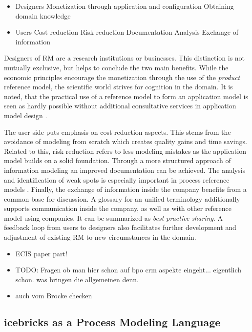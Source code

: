 		\begin{itemize}
			\item Designers
			\subitem Monetization through application and configuration
			\subitem Obtaining domain knowledge
			\item Users
			\subitem Cost reduction
			\subitem Risk reduction
			\subitem Documentation
			\subitem Analysis
			\subitem Exchange of information  
		\end{itemize} 
	
		Designers of \acrshort{RM} are a research institutions or businesses. This distinction is not mutually exclusive,  but helps to conclude the two main benefits. While the economic principles encourage the monetization through the use of the \textit{product} reference model, the scientific world strives for cognition in the domain. It is noted, that the practical use of a reference model to form an application model is seen as hardly possible without additional consultative services in application model design \citep{Schutte1998}.
	
		The user side puts emphasis on cost reduction aspects. This stems from the avoidance of modeling from scratch which creates quality gains and time savings. Related to this, risk reduction refers to less modeling mistakes as the application model builds on a solid foundation. Through a more structured approach of information modeling an improved documentation can be achieved. The analysis and identification of weak spots is especially important in process reference models \citep[]{becker2004handelsinformationssysteme}. Finally, the exchange of information inside the company benefits from a common base for discussion. A glossary for an unified terminology additionally supports communication inside the company, as well as with other reference model using companies. It can be summarized as \textit{best practice sharing}. A feedback loop from users to designers also facilitates further development and adjustment of existing \acrshort{RM} to new circumstances in the domain. 
		
		\begin{itemize}
			\item  ECIS paper part!
			\item TODO: Fragen ob man hier schon auf bpo crm aspekte eingeht... eigentlich schon. was bringen die allgemeinen denn. 
			\item auch vom Brocke checken 
		\end{itemize}
		\subsection{icebricks as a Process Modeling Language}
		
